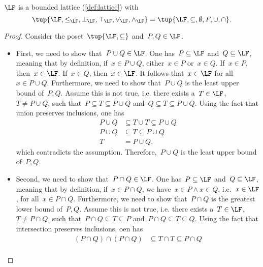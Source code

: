 \begin{lemma}
    $\LF$ is a bounded lattice (\cref{def:lattice}) with
    \begin{equation}
        \tup{\LF,\leq_{\LF},\bot_{\LF},\top_{\LF},\vee_{\LF},\wedge_{\LF}}=\tup{\LF,\subseteq,\emptyset,F,\cup,\cap}.
    \end{equation}
\end{lemma}
\begin{proof}
    Consider the poset~$\tup{\LF,\subseteq}$ and~$P,Q\in \LF$.
    \begin{itemize}
        \item First, we need to show that~$P\cup Q\in \LF$. One has~$P \subseteq \LF$ and~$Q\subseteq \LF$, meaning that by definition, if~$x\in P\cup Q$, either~$x\in P$ or~$x\in Q$. If~$x\in P$, then~$x\in \LF$. If~$x\in Q$, then~$x\in \LF$. It follows that~$x\in \LF$ for all~$x\in P\cup Q$. Furthermore, we need to show that~$P\cup Q$ is the least upper bound of~$P,Q$. Assume this is not true, i.e. there exists a~$T\in \LF$,~$T\neq P\cup Q$, such that~$P\subseteq T\subseteq P\cup Q$ and~$Q\subseteq T\subseteq P\cup Q$. Using the fact that union preserves inclusions, one has
        \begin{equation}
            \begin{aligned}
                P\cup Q &\subseteq T\cup T \subseteq P\cup Q\\
                P\cup Q &\subseteq T \subseteq P\cup Q\\
                T&= P\cup Q,
            \end{aligned}
        \end{equation}
        which contradicts the assumption. Therefore,~$P\cup Q$ is the least upper bound of~$P,Q$.
        \item Second, we need to show that~$P\cap Q\in \LF$. One has~$P\subseteq \LF$ and~$Q\subseteq \LF$, meaning that by definition, if~$x\in P\cap Q$, we have~$x\in P\wedge x\in Q$, i.e.~$x\in \LF$, for all~$x\in P\cap Q$. Furthermore, we need to show that~$P\cap Q$ is the greatest lower bound of~$P,Q$. Assume this is not true, i.e. there exists a~$T\in \LF$,~$T\neq P\cap Q$, such that~$P\cap Q\subseteq T\subseteq P$ and~$P\cap Q\subseteq T\subseteq Q$. Using the fact that intersection preserves inclusions, oen has
        \begin{equation}
            \begin{aligned}
            (P\cap Q)
                \cap (P\cap Q) &\subseteq T \cap T \subseteq P\cap Q\\

\end{aligned}
\end{equation}
\end{itemize}
\end{proof}

